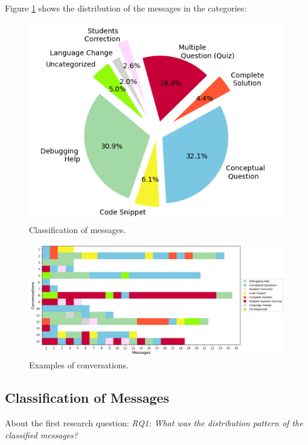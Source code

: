 \documentclass[a4paper,twoside]{article}
\begin{document}
Figure \ref{fig:graph1} shows the distribution of the messages in the
categories:

\begin{figure}[h!]
    \centering
    \includegraphics[scale=0.62]{img/figure1.png}
    \caption{Classification of messages.}
    \label{fig:graph1}
\end{figure}

\begin{figure}[htbp]
  \centering
  \includegraphics[scale=0.52]{img/figure2.png}
  \caption{Examples of conversations.}
  \label{fig:graph2}
\end{figure}

\subsection{Classification of Messages}

About the first research question: \textit{RQ1: What was the distribution
pattern of the classified messages?}
\end{document}
